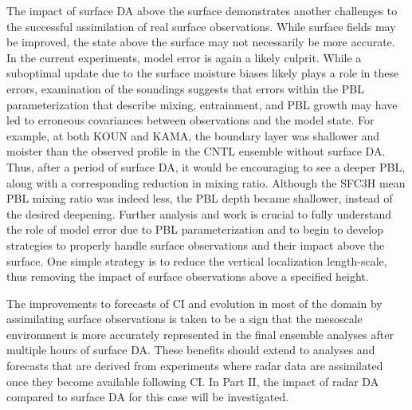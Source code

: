 The impact of surface DA above the surface demonstrates another challenges to the successful assimilation of real surface observations. While surface fields may be improved, the state above the surface may not necessarily be more accurate. In the current experiments, model error is again a likely culprit. While a suboptimal update due to the surface moisture biases likely plays a role in these errors, examination of the soundings suggests that errors within the PBL parameterization that describe mixing, entrainment, and PBL growth may have led to erroneous covariances between observations and the model state. For example, at both KOUN and KAMA, the boundary layer was shallower and moister than the observed profile in the CNTL ensemble without surface DA. Thus, after a period of surface DA, it would be encouraging to see a deeper PBL, along with a corresponding reduction in mixing ratio. Although the SFC3H mean PBL mixing ratio was indeed less, the PBL depth became shallower, instead of the desired deepening. Further analysis and work is crucial to fully understand the role of model error due to PBL parameterization and to begin to develop strategies to properly handle surface observations and their impact above the surface. One simple strategy is to reduce the vertical localization length-scale, thus removing the impact of surface observations above a specified height.

The improvements to forecasts of CI and evolution in most of the domain by assimilating surface observations is taken to be a sign that the mesoscale environment is more accurately represented in the final ensemble analyses after multiple hours of surface DA. These benefits should extend to analyses and forecasts that are derived from experiments where radar data are assimilated once they become available following CI. In Part II, the impact of radar DA compared to surface DA for this case will be investigated.
